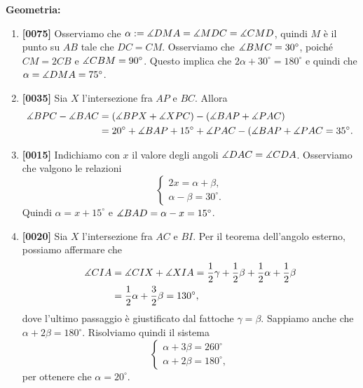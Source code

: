 \documentclass{article}
\begin{document}
\textbf{Geometria:}
\begin{enumerate}
	\item \textbf{[0075]} Osserviamo che
		$\alpha:=\measuredangle{DMA}=\measuredangle{MDC}=\measuredangle{CMD}$,
		quindi $M$ è il punto su $AB$ tale che $DC=CM$. Osserviamo che
		$\measuredangle{BMC}=30^{\circ}$, poiché $CM=2CB$ e $\measuredangle{CBM}=90^\circ$.
		Questo implica che $2\alpha+30^\circ=180^\circ$ e quindi che
		$\alpha=\measuredangle{DMA}=75^\circ$.
	\item \textbf{[0035]} Sia $X$ l'intersezione fra $AP$ e $BC$.
		Allora
		\begin{align*}
			\measuredangle{BPC}-\measuredangle{BAC}&=(\measuredangle{BPX}+\measuredangle{XPC})-(\measuredangle{BAP}+\measuredangle{PAC}) \\
										&=20^\circ+\measuredangle{BAP}+15^\circ+
										\measuredangle{PAC}-(\measuredangle{BAP}+\measuredangle{PAC}=35^\circ.
		\end{align*}

	\item \textbf{[0015]} Indichiamo con $x$ il valore degli angoli
		$\measuredangle{DAC}=\measuredangle{CDA}$. Osserviamo che valgono le relazioni
		\begin{equation*}
		\begin{cases}
				2x=\alpha+\beta, \\
				\alpha-\beta=30^\circ.
			\end{cases}
		\end{equation*}
		Quindi $\alpha=x+15^\circ$ e $\measuredangle{BAD}=\alpha-x=15^\circ$.

	\item \textbf{[0020]} Sia $X$ l'intersezione fra $AC$ e $BI$.
		Per il teorema dell'angolo esterno, possiamo affermare che
		\begin{align*}
			\measuredangle{CIA}&=\measuredangle{CIX}+\measuredangle{XIA}
						=\frac{1}{2}\gamma+\frac{1}{2}\beta+
						\frac{1}{2}\alpha+\frac{1}{2}\beta \\
						 &=\frac{1}{2}\alpha+\frac{3}{2}\beta=130^\circ,
		\end{align*}
		dove l'ultimo passaggio è giustificato dal fattoche $\gamma=\beta$.
		Sappiamo anche che $\alpha+2\beta=180^\circ$. Risolviamo quindi
		il sistema
		\begin{equation*}
			\begin{cases}
				\alpha+3\beta=260^\circ \\
				\alpha+2\beta=180^\circ,
			\end{cases}
		\end{equation*}
		per ottenere che $\alpha=20^\circ$.
\end{enumerate}
\end{document}
